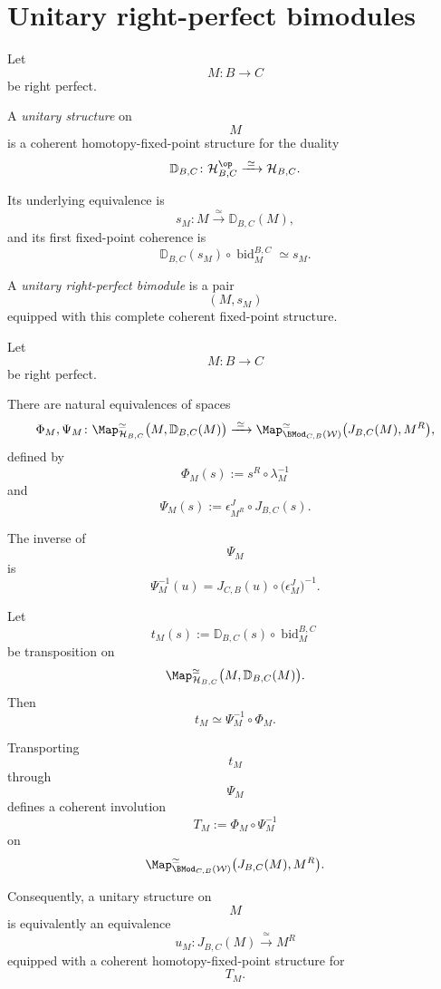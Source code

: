 \section{Unitary right-perfect bimodules}
\label{sec:unitary-right-perfect-bimodules}

\begin{definition}
\label{def:unitary-right-perfect-bimodule}
Let
\[
    M
    \colon
    B
    \longrightarrow
    C
\]
be right perfect.

A \emph{unitary structure} on
\[
    M
\]
is a coherent homotopy-fixed-point structure for the duality
\[
    \mathbb D_{B,C}
    \colon
    \mathcal H_{B,C}^{\op}
    \xrightarrow{\;\simeq\;}
    \mathcal H_{B,C}.
\]

Its underlying equivalence is
\[
    s_M
    \colon
    M
    \xrightarrow{\;\simeq\;}
    \mathbb D_{B,C}(M),
\]
and its first fixed-point coherence is
\[
    \mathbb D_{B,C}(s_M)
    \circ
    \operatorname{bid}^{B,C}_M
    \simeq
    s_M.
\]

A \emph{unitary right-perfect bimodule} is a pair
\[
    (M,s_M)
\]
equipped with this complete coherent fixed-point structure.
\end{definition}

\begin{proposition}
\label{prop:unitary-adjoint-formulation}
Let
\[
    M
    \colon
    B
    \longrightarrow
    C
\]
be right perfect.

There are natural equivalences of spaces
\[
\begin{aligned}
    \Phi_M,\Psi_M
    \colon
    \Map^\simeq_{\mathcal H_{B,C}}
    \bigl(
        M,
        \mathbb D_{B,C}(M)
    \bigr)
    \xrightarrow{\;\simeq\;}
    \Map^\simeq_{\BMod_{C,B}(\mathcal W)}
    \bigl(
        J_{B,C}(M),
        M^R
    \bigr),
\end{aligned}
\]
defined by
\[
    \Phi_M(s)
    :=
    s^R\circ\lambda_M^{-1}
\]
and
\[
    \Psi_M(s)
    :=
    \epsilon^J_{M^R}
    \circ
    J_{B,C}(s).
\]

The inverse of
\[
    \Psi_M
\]
is
\[
    \Psi_M^{-1}(u)
    =
    J_{C,B}(u)
    \circ
    \bigl(
        \epsilon^J_M
    \bigr)^{-1}.
\]

Let
\[
    t_M(s)
    :=
    \mathbb D_{B,C}(s)
    \circ
    \operatorname{bid}^{B,C}_M
\]
be transposition on
\[
    \Map^\simeq_{\mathcal H_{B,C}}
    \bigl(
        M,
        \mathbb D_{B,C}(M)
    \bigr).
\]
Then
\[
    t_M
    \simeq
    \Psi_M^{-1}\circ\Phi_M.
\]

Transporting
\[
    t_M
\]
through
\[
    \Psi_M
\]
defines a coherent involution
\[
    T_M
    :=
    \Phi_M\circ\Psi_M^{-1}
\]
on
\[
    \Map^\simeq_{\BMod_{C,B}(\mathcal W)}
    \bigl(
        J_{B,C}(M),
        M^R
    \bigr).
\]

Consequently, a unitary structure on
\[
    M
\]
is equivalently an equivalence
\[
    u_M
    \colon
    J_{B,C}(M)
    \xrightarrow{\;\simeq\;}
    M^R
\]
equipped with a coherent homotopy-fixed-point structure for
\[
    T_M.
\]
\end{proposition}

